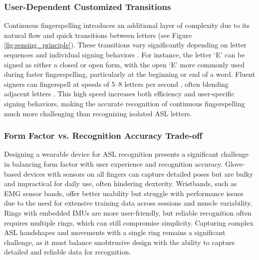 \subsubsection{User-Dependent Customized Transitions}
Continuous fingerspelling introduces an additional layer of complexity due to its natural flow and quick transitions between letters (see Figure \ref{fig:sensing_principle}). These transitions vary significantly depending on letter sequences and individual signing behaviors \cite{keane2016fingerspelling, keane2015segmentation}. For instance, the letter `E' can be signed as either a closed or open form, with the open `E' more commonly used during faster fingerspelling, particularly at the beginning or end of a word.
Fluent signers can fingerspell at speeds of 5--8 letters per second \cite{hanson1982use, quinto2010rates, keane2016fingerspelling}, often blending adjacent letters \cite{hassan2023tap, shi2018american, keane2015segmentation}. This high speed increases both efficiency and user-specific signing behaviors, making the accurate recognition of continuous fingerspelling much more challenging than recognizing isolated ASL letters.


\subsubsection{Form Factor vs. Recognition Accuracy Trade-off}
Designing a wearable device for ASL recognition presents a significant challenge in balancing form factor with user experience and recognition accuracy. Glove-based devices with sensors on all fingers can capture detailed poses but are bulky and impractical for daily use, often hindering dexterity. Wristbands, such as EMG sensor bands, offer better usability but struggle with performance issues due to the need for extensive training data across sessions and muscle variability.
Rings with embedded IMUs are more user-friendly, but reliable recognition often requires multiple rings, which can still compromise simplicity. Capturing complex ASL handshapes and movements with a single ring remains a significant challenge, as it must balance unobtrusive design with the ability to capture detailed and reliable data for recognition.


